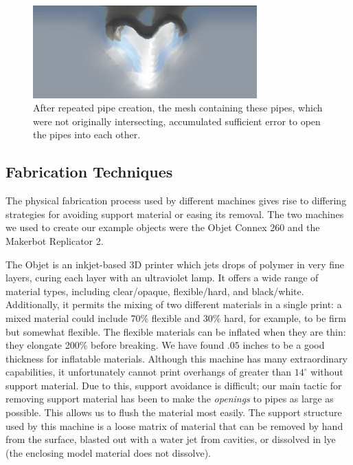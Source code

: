 \begin{figure}[h!]
\centering
    \includegraphics[width=3.4in]{figures/voxelize-fail.png}
\caption{After repeated pipe creation, the mesh containing these pipes, which were not originally intersecting, accumulated sufficient error to open the pipes into each other.}
\label{fig:voxelize}
\end{figure}


\subsection{Fabrication Techniques}

The physical fabrication process used by different machines gives rise to differing strategies for avoiding support material or easing its removal.  The two machines we used to create our example objects were the Objet Connex 260 and the Makerbot Replicator 2.

The Objet is an inkjet-based 3D printer which jets drops of polymer in very fine layers, curing each layer with an ultraviolet lamp.  It offers a wide range of material types, including clear/opaque, flexible/hard, and black/white.  Additionally, it permits the mixing of two different materials in a single print: a mixed material could include 70\% flexible and 30\% hard, for example, to be firm but somewhat flexible.  The flexible materials can be inflated when they are thin: they elongate 200\% before breaking.  We have found $.05$ inches to be a good thickness for inflatable materials.  Although this machine has many extraordinary capabilities, it unfortunately cannot print overhangs of greater than $14^{\circ}$ without support material.  Due to this, support avoidance is difficult; our main tactic for removing support material has been to make the \emph{openings} to pipes as large as possible.  This allows us to flush the material most easily.  The support structure used by this machine is a loose matrix of material that can be removed by hand from the surface, blasted out with a water jet from cavities, or dissolved in lye (the enclosing model material does not dissolve).

